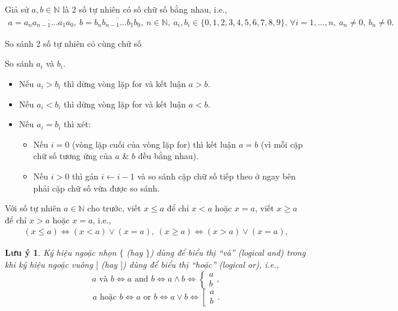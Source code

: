 \documentclass{article}
\numberwithin{equation}{section}
\newtheorem{remark}{Lưu ý}[section]
\begin{document}
Giả sử $a,b\in\mathbb{N}$ là 2 số tự nhiên có số chữ số bằng nhau, i.e.,
\begin{align*}
	a = \overline{a_na_{n-1}\ldots a_1a_0},\ b = \overline{b_nb_{n-1}\ldots b_1b_0},\ n\in\mathbb{N},\ a_i,b_i\in\{0,1,2,3,4,5,6,7,8,9\},\,\forall i = 1,\ldots,n,\ a_n\ne 0,\ b_n\ne 0.
\end{align*}

\begin{algorithm}
	\caption{So sánh 2 số tự nhiên có cùng chữ số}\label{alg:compare naturals with same digits}
	\begin{algorithmic}[1]
		 So sánh $a_i$ và $b_i$.
		\begin{itemize}
			\item Nếu $a_i > b_i$ thì dừng vòng lặp for và kết luận $a > b$.
			\item Nếu $a_i < b_i$ thì dừng vòng lặp for và kết luận $a < b$.
			\item Nếu $a_i = b_i$ thì xét:
			\begin{itemize}
				\item Nếu $i = 0$ (vòng lặp cuối của vòng lặp for) thì kết luận $a = b$ (vì mỗi cặp chữ số tương ứng của $a$ \& $b$ đều bằng nhau).
				\item Nếu $i > 0$ thì gán $i\leftarrow i - 1$ và so sánh cặp chữ số tiếp theo ở ngay bên phải cặp chữ số vừa được so sánh.
			\end{itemize}			 
		\end{itemize}		
		\EndFor
	\end{algorithmic}
\end{algorithm}
Với số tự nhiên $a\in\mathbb{N}$ cho trước, viết $x\le a$ để chỉ $x < a$ hoặc $x = a$, viết $x\ge a$ để chỉ $x > a$ hoặc $x = a$, i.e.,
\begin{align*}
	(x\le a)\Leftrightarrow(x < a)\lor(x = a),\ (x\ge a)\Leftrightarrow(x > a)\lor(x = a),
\end{align*}

\begin{remark}
	Ký hiệu ngoặc nhọn $\{$ (hay $\}$) dùng để biểu thị ``và'' (logical and) trong khi ký hiệu ngoặc vuông $[$ (hay $]$) dùng để biểu thị ``hoặc'' (logical or), i.e.,
	\begin{equation*}
		a\mbox{ và } b\Leftrightarrow a\mbox{ and } b\Leftrightarrow a\land b\Leftrightarrow\left\{\begin{split}
			a\\b
		\end{split}\right.,	
	\end{equation*}
	\begin{equation*}
		a\mbox{ hoặc } b\Leftrightarrow a\mbox{ or } b\Leftrightarrow a\lor b\Leftrightarrow\left[\begin{split}
			a\\b
		\end{split}\right..
	\end{equation*}
\end{remark}
\end{document}

